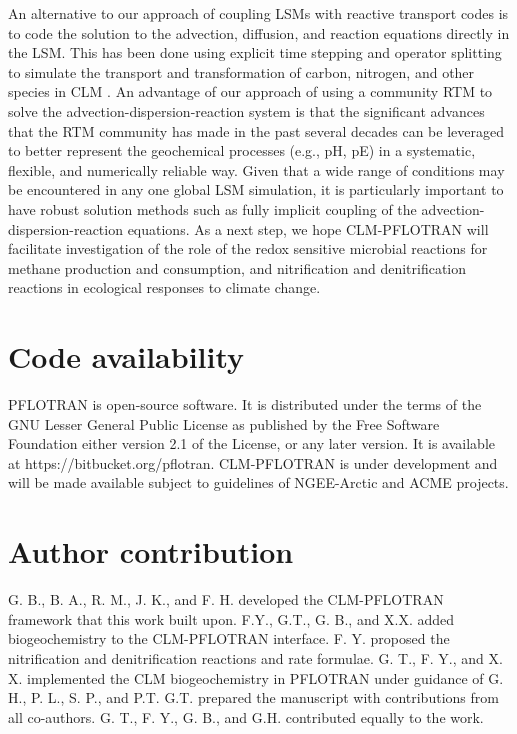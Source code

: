 \documentclass[gmd, manuscript]{copernicus}
\begin{document}
An alternative to our approach of coupling LSMs with reactive transport codes
is to code the solution to the advection, diffusion, and reaction equations
directly in the LSM. This has been done using explicit time stepping and
operator splitting to simulate the transport and transformation of carbon,
nitrogen, and other species in CLM \citep{Tang2013b}. An advantage of our
approach of using a community RTM to solve the advection-dispersion-reaction
system is that the significant advances that the RTM community has made in the
past several decades can be leveraged to better represent the geochemical
processes (e.g., pH, pE) in a systematic, flexible, and numerically reliable
way. Given that a wide range of conditions may be encountered in any one global
LSM simulation, it is particularly important to have robust solution methods
such as fully implicit coupling of the advection-dispersion-reaction equations.
As a next step, we hope CLM-PFLOTRAN will facilitate investigation of the role
of the redox sensitive microbial reactions for methane production and
consumption, and nitrification and denitrification reactions in ecological
responses to climate change.  



%
\section{Code availability}
PFLOTRAN is open-source software. It is distributed under the terms of the
GNU Lesser General Public License as published by the Free Software Foundation
either version 2.1 of the License, or any later version. It is available at
https://bitbucket.org/pflotran. 
CLM-PFLOTRAN is under development and will be made available subject to guidelines of NGEE-Arctic and ACME projects.

\section{Author contribution}
G. B., B. A., R. M., J. K., and F. H. developed the CLM-PFLOTRAN framework that this
work built upon. F.Y., G.T., G. B., and X.X. added biogeochemistry to the CLM-PFLOTRAN
interface. F. Y. proposed the nitrification and denitrification reactions and
rate formulae. G. T., F. Y., and X. X. implemented the CLM
biogeochemistry in PFLOTRAN under guidance of G. H., P. L., S. P., and P.T.
G.T. prepared the manuscript with contributions from all co-authors. 
G. T., F. Y., G. B., and G.H. contributed equally to the work.  
\end{document}
